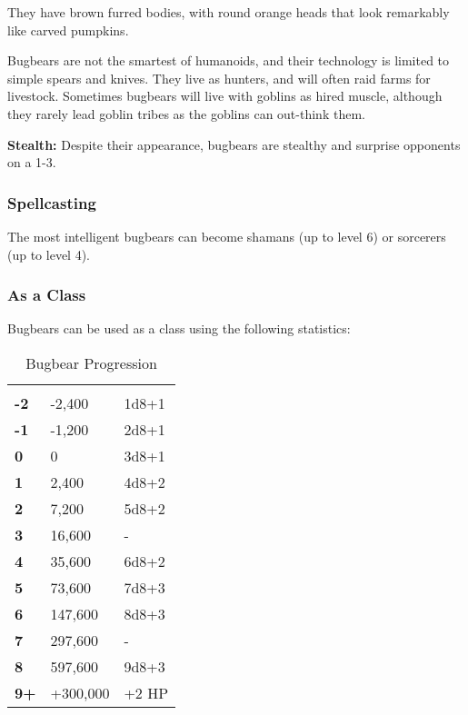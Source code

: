 \begin{multicols*}{2}
They have brown furred bodies, with round orange heads that look remarkably like carved pumpkins.

Bugbears are not the smartest of humanoids, and their technology is limited to simple spears and knives. They live as hunters, and will often raid farms for livestock. Sometimes bugbears will live with goblins as hired muscle, although they rarely lead goblin tribes as the goblins can out-think them.

\textbf{Stealth:} Despite their appearance, bugbears are stealthy and surprise opponents on a 1-3.

\subsubsection{Spellcasting}
The most intelligent bugbears can become shamans (up to level 6) or sorcerers (up to level 4).

\subsubsection{As a Class}
Bugbears can be used as a class using the following statistics:


\begin {table}[H]
  \caption{Bugbear Progression}
  \begin{tabularx}{\columnwidth}{>{\bfseries}YYY}
	 &  & \\
	-2 & -2,400 & 1d8+1\\
	-1 & -1,200 & 2d8+1\\
	0 & 0 & 3d8+1\\
	1 & 2,400 & 4d8+2\\
	2 & 7,200 & 5d8+2\\
	3 & 16,600 & -\\
	4 & 35,600 & 6d8+2\\
	5 & 73,600 & 7d8+3\\
	6 & 147,600 & 8d8+3\\
	7 & 297,600 & -\\
	8 & 597,600 & 9d8+3\\
	9+ & +300,000 & +2 HP
  \end {tabularx}
\end {table}


\end{multicols*}
